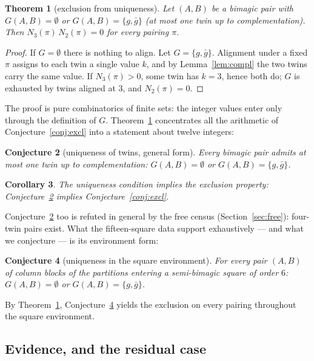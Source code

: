 \documentclass[11pt]{article}
\newtheorem{theorem}{Theorem}
\newtheorem{corollary}[theorem]{Corollary}
\newtheorem{conjecture}[theorem]{Conjecture}
\begin{document}
\begin{theorem}[exclusion from uniqueness]\label{thm:G}
Let $(A,B)$ be a bimagic pair with $G(A,B)=\emptyset$ or
$G(A,B)=\{g,\bar g\}$ (at most one twin up to complementation). Then
$N_3(\pi)\,N_2(\pi)=0$ for every pairing $\pi$.
\end{theorem}

\begin{proof}
If $G=\emptyset$ there is nothing to align. Let $G=\{g,\bar g\}$.
Alignment under a fixed $\pi$ assigns to each twin a single value
$k$, and by Lemma~\ref{lem:compl} the two twins carry the same value.
If $N_3(\pi)>0$, some twin has $k=3$, hence both do; $G$ is exhausted
by twins aligned at $3$, and $N_2(\pi)=0$.
\end{proof}

The proof is pure combinatorics of finite sets: the integer values
enter only through the definition of $G$. Theorem~\ref{thm:G}
concentrates all the arithmetic of Conjecture~\ref{conj:excl} into a
statement about twelve integers:

\begin{conjecture}[uniqueness of twins, general form]\label{conj:uniq}
Every bimagic pair admits at most one twin up to complementation:
$G(A,B)=\emptyset$ or $G(A,B)=\{g,\bar g\}$.
\end{conjecture}

\begin{corollary}
The uniqueness condition implies the exclusion property:
Conjecture~\ref{conj:uniq} implies Conjecture~\ref{conj:excl}.
\end{corollary}

Conjecture~\ref{conj:uniq} too is refuted in general by the free
census (Section~\ref{sec:free}): four-twin pairs exist. What the
fifteen-square data support exhaustively --- and what we conjecture
--- is its environment form:

\begin{conjecture}[uniqueness in the square environment]\label{conj:world}
For every pair $(A,B)$ of column blocks of the partitions entering a
semi-bimagic square of order $6$:\ \ $G(A,B)=\emptyset$ or
$G(A,B)=\{g,\bar g\}$.
\end{conjecture}

By Theorem~\ref{thm:G}, Conjecture~\ref{conj:world} yields the
exclusion on every pairing throughout the square environment.

\subsection{Evidence, and the residual case}\label{sec:residual}
\end{document}
